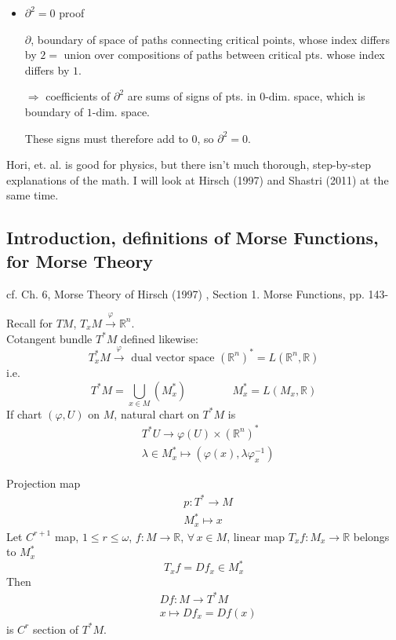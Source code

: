\begin{itemize}
\item $\partial^2=0$ proof

  $\partial$, boundary of space of paths connecting critical points, whose index differs by $2 =$ union over compositions of paths between critical pts. whose index differs by $1$.

  $\Longrightarrow$ coefficients of $\partial^2$ are sums of signs of pts. in $0$-dim. space, which is boundary of $1$-dim. space.

  These signs must therefore add to $0$, so $\partial^2=0$.  
  
  \end{itemize}

Hori, et. al. \cite{dgdt:Hori2003} is good for physics, but there isn't much thorough, step-by-step explanations of the math.  I will look at Hirsch (1997) \cite{dgdt:MHirsch1997} and Shastri (2011) \cite{dgdt:AShastri2011} at the same time.  

\subsection{Introduction, definitions of Morse Functions, for Morse Theory}

cf. Ch. 6, Morse Theory of Hirsch (1997) \cite{dgdt:MHirsch1997}, Section 1. Morse Functions, pp. 143-

Recall for $TM$, $T_xM \xrightarrow{\varphi}\mathbb{R}^n$.  \\
Cotangent bundle $T^*M$ defined likewise:
\[
T^*_xM \xrightarrow{ \varphi } \text{ dual vector space } (\mathbb{R}^n)^* = L(\mathbb{R}^n,\mathbb{R})
\]
i.e.
\[
T^*M = \bigcup_{x\in M} (M_x^*) \qquad \qquad \, M_x^* = L(M_x,\mathbb{R})
\]
If chart $(\varphi, U)$ on $M$, natural chart on $T^*M$ is
\[
\begin{aligned}
  & T^*U \to \varphi(U) \times (\mathbb{R}^n)^* \\ 
  & \lambda \in M_x^* \mapsto (\varphi(x), \lambda \varphi_x^{-1} )
  \end{aligned}
\]

Projection map
\[
\begin{aligned}
  & p : T^* \to M \\ 
  & M_x^* \mapsto x
  \end{aligned}
\]
Let $C^{r+1}$ map, $1\leq r \leq \omega$, $f:M \to \mathbb{R}$, $\forall \, x \in M$, linear map $T_x f :M_x \to \mathbb{R}$ belongs to $M_x^*$
\[
T_xf = Df_x \in M_x^*
\]
Then
\[
\begin{aligned}
  & Df:M \to T^*M \\ 
  &  x\mapsto Df_x = Df(x)
  \end{aligned}
\]
is $C^r$ section of $T^*M$.  


